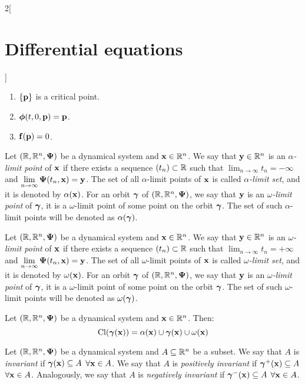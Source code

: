 \documentclass[../../../main.tex]{subfiles}
\begin{document}
\begin{multicols}{2}[\section{Differential equations}]
\begin{proposition}
    \begin{enumerate}
      \item $\{\boldsymbol{\mathrm{p}}\}$ is a critical point.
      \item $\boldsymbol{\mathrm{\phi}}(t,0,\boldsymbol{\mathrm{p}})=\boldsymbol{\mathrm{p}}$.
      \item $\boldsymbol{\mathrm{f}}(\boldsymbol{\mathrm{p}})=0$.
    \end{enumerate}
  \end{proposition}
  \begin{definition}
    Let $(\mathbb{R},\mathbb{R}^n,\boldsymbol{\mathrm{\Psi}})$ be a dynamical system and $\boldsymbol{\mathrm{x}}\in\mathbb{R}^n$. We say that $\boldsymbol{\mathrm{y}}\in\mathbb{R}^n$ is an \emph{$\alpha$-limit point} of $\boldsymbol{\mathrm{x}}$ if there exists a sequence $(t_n)\subset\mathbb{R}$ such that $\displaystyle\lim_{n\to\infty}t_n=-\infty$ and $\displaystyle\lim_{n\to\infty}\boldsymbol{\mathrm{\Psi}}(t_n,\boldsymbol{\mathrm{x}})=\boldsymbol{\mathrm{y}}$.
    The set of all $\alpha$-limit points of $\boldsymbol{\mathrm{x}}$ is called \emph{$\alpha$-limit set}, and it is denoted by $\alpha(\boldsymbol{\mathrm{x}})$. For an orbit $\boldsymbol{\mathrm{\gamma}}$ of $(\mathbb{R},\mathbb{R}^n,\boldsymbol{\mathrm{\Psi}})$, we say that $\boldsymbol{\mathrm{y}}$ is an \emph{$\omega$-limit point} of $\boldsymbol{\mathrm{\gamma}}$, it is a $\omega$-limit point of some point on the orbit $\boldsymbol{\mathrm{\gamma}}$. The set of such $\alpha$-limit points will be denoted as $\alpha(\boldsymbol{\mathrm{\gamma}})$.
  \end{definition}
  \begin{definition}
    Let $(\mathbb{R},\mathbb{R}^n,\boldsymbol{\mathrm{\Psi}})$ be a dynamical system and $\boldsymbol{\mathrm{x}}\in\mathbb{R}^n$. We say that $\boldsymbol{\mathrm{y}}\in\mathbb{R}^n$ is an \emph{$\omega$-limit point} of $\boldsymbol{\mathrm{x}}$ if there exists a sequence $(t_n)\subset\mathbb{R}$ such that $\displaystyle\lim_{n\to\infty}t_n=+\infty$ and $\displaystyle\lim_{n\to\infty}\boldsymbol{\mathrm{\Psi}}(t_n,\boldsymbol{\mathrm{x}})=\boldsymbol{\mathrm{y}}$.
    The set of all $\omega$-limit points of $\boldsymbol{\mathrm{x}}$ is called \emph{$\omega$-limit set}, and it is denoted by $\omega(\boldsymbol{\mathrm{x}})$. For an orbit $\boldsymbol{\mathrm{\gamma}}$ of $(\mathbb{R},\mathbb{R}^n,\boldsymbol{\mathrm{\Psi}})$, we say that $\boldsymbol{\mathrm{y}}$ is an \emph{$\omega$-limit point} of $\boldsymbol{\mathrm{\gamma}}$, it is a $\omega$-limit point of some point on the orbit $\boldsymbol{\mathrm{\gamma}}$. The set of such $\omega$-limit points will be denoted as $\omega(\boldsymbol{\mathrm{\gamma}})$.
  \end{definition}
  \begin{proposition}
    Let $(\mathbb{R},\mathbb{R}^n,\boldsymbol{\mathrm{\Psi}})$ be a dynamical system and $\boldsymbol{\mathrm{x}}\in\mathbb{R}^n$. Then: $$\operatorname{Cl}(\boldsymbol{\mathrm{\gamma}}(\boldsymbol{\mathrm{x}}))=\alpha(\boldsymbol{\mathrm{x}})\cup\boldsymbol{\mathrm{\gamma}}(\boldsymbol{\mathrm{x}})\cup\omega(\boldsymbol{\mathrm{x}})$$
  \end{proposition}
  \begin{definition}
    Let $(\mathbb{R},\mathbb{R}^n,\boldsymbol{\mathrm{\Psi}})$ be a dynamical system and $A\subseteq \mathbb{R}^n$ be a subset. We say that $A$ is \emph{invariant} if $\boldsymbol{\mathrm{\gamma}}(\boldsymbol{\mathrm{x}})\subseteq A$ $\forall\boldsymbol{\mathrm{x}}\in A$. We say that $A$ is \emph{positively invariant} if ${\boldsymbol{\mathrm{\gamma}}}^+(\boldsymbol{\mathrm{x}})\subseteq A$ $\forall\boldsymbol{\mathrm{x}}\in A$. Analogously, we say that $A$ is \emph{negatively invariant} if ${\boldsymbol{\mathrm{\gamma}}}^-(\boldsymbol{\mathrm{x}})\subseteq A$ $\forall\boldsymbol{\mathrm{x}}\in A$.

\end{definition}
\end{multicols}
\end{document}
